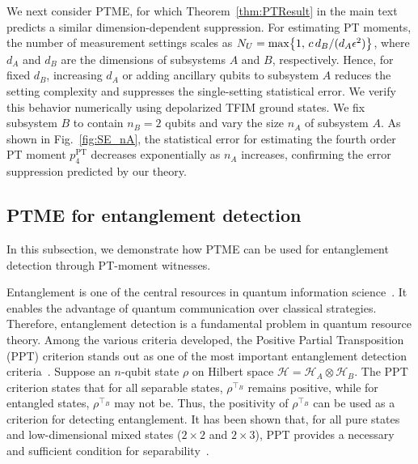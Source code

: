 \documentclass[aps,prl,twocolumn,nofootinbib,superscriptaddress,10pt]{revtex4-2}
\let\originalleft\left
\let\originalright\right
\renewcommand{\left}{\mathopen{}\mathclose\bgroup\originalleft}
\renewcommand{\right}{\aftergroup\egroup\originalright}
\theoremstyle{plain}
\theoremstyle{definition}
\newcommand{\PT}{\mathrm{PT}}
\newcommand{\caH}{\mathcal{H}}
\newcommand{\tref}[1]{Theorem~\ref{#1}}
\begin{document}
We next consider PTME, for which
\tref{thm:PTResult} in the main text  predicts a similar dimension-dependent suppression. 
For estimating PT moments, the number of measurement settings scales as $N_U=\max\left\{1,\,c\,d_B/(d_A\epsilon^2) \right\}$, 
where \(d_A\) and \(d_B\) are the dimensions of subsystems $A$ and $B$, respectively. 
Hence, for fixed \(d_B\), increasing \(d_A\) or adding ancillary qubits to subsystem $A$ reduces the setting complexity and suppresses the single-setting statistical error.
We verify this behavior numerically using depolarized TFIM ground states. 
We fix subsystem \(B\) to contain \(n_B=2\) qubits and vary the size \(n_A\) of subsystem \(A\). 
As shown in Fig.~\ref{fig:SE_nA}, the statistical error for estimating the fourth order PT moment $p_4^{\PT}$ decreases exponentially as \(n_A\) increases, confirming the error suppression predicted by our theory. 




\subsection{PTME for entanglement detection}

In this subsection, we demonstrate how PTME can be used for entanglement detection through PT-moment witnesses. 


Entanglement is one of the central resources in quantum information science~\cite{Horodecki2009Entanglement}. It enables the advantage of quantum communication over classical strategies. Therefore, entanglement detection is a fundamental problem in quantum resource theory. Among the various criteria developed, the Positive Partial Transposition (PPT) criterion stands out as one of the most important entanglement detection criteria~\cite{Peres1996PPT}. Suppose an $n$-qubit state $\rho$ on Hilbert space $\caH = \caH_A \otimes \caH_B$. The PPT criterion states that for all separable states, $\rho^{\top_B}$ remains positive, while for entangled states, $\rho^{\top_B}$ may not be. 
Thus, the positivity of $\rho^{\top_B}$ can be used as a criterion for detecting entanglement. It has been shown that, for all pure states and low-dimensional mixed states ($2 \times 2$ and $2 \times 3$), PPT provides a necessary and sufficient condition for separability~\cite{Horodecki1996PPT}.
\end{document}
